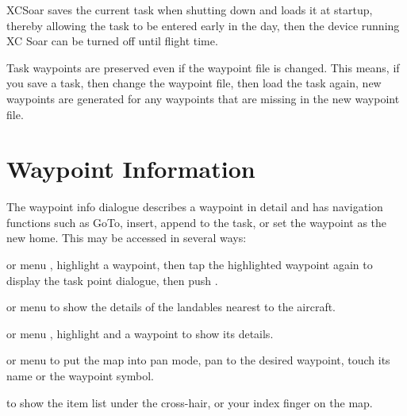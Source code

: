 XCSoar saves the current task when shutting down and loads it at
startup, thereby allowing the task to be entered early in the day,
then the device running XC Soar can be turned off until flight time.

Task waypoints are preserved even if the waypoint
file is changed.  This means, if you save a task, then change the
waypoint file, then load the task again, new waypoints are generated
for any waypoints that are missing in the new waypoint file.

\section{Waypoint Information}

The waypoint info dialogue describes a waypoint in detail and has
navigation functions such as GoTo, insert, append to the task, or set the
waypoint as the new home.
This may be accessed in several ways:

or menu \blink{},
highlight a waypoint, then tap the highlighted waypoint again to display the
task point dialogue, then push .

or menu \blink{}
to show the
details of the landables nearest to the aircraft.

or menu \blink{}
, highlight and  a waypoint to show its details.

or menu \blink{} to put the
map into pan mode, pan to the desired waypoint, touch its name or the waypoint
symbol.

\blink{}
to show the
item list under the cross-hair, or your index finger on the map.

